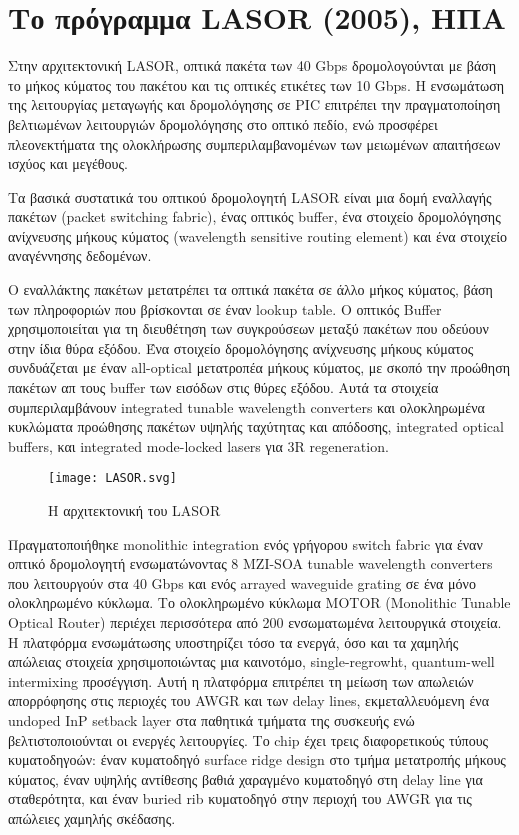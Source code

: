 
\section{Το πρόγραμμα LASOR (2005), ΗΠΑ}

Στην αρχιτεκτονική LASOR, οπτικά πακέτα των 40 Gbps δρομολογούνται με
βάση το μήκος κύματος του πακέτου και τις οπτικές ετικέτες των 10
Gbps. Η ενσωμάτωση της λειτουργίας μεταγωγής και δρομολόγησης σε PIC
επιτρέπει την πραγματοποίηση βελτιωμένων λειτουργιών δρομολόγησης στο
οπτικό πεδίο, ενώ προσφέρει πλεονεκτήματα της ολοκλήρωσης
συμπεριλαμβανομένων των μειωμένων απαιτήσεων ισχύος και μεγέθους.

Τα βασικά συστατικά του οπτικού δρομολογητή LASΟR \cite{1584172} είναι
μια δομή εναλλαγής πακέτων (packet switching fabric), ένας οπτικός
buffer, ένα στοιχείο δρομολόγησης ανίχνευσης μήκους κύματος
(wavelength sensitive routing element) και ένα στοιχείο αναγέννησης
δεδομένων.

Ο εναλλάκτης πακέτων μετατρέπει τα οπτικά πακέτα σε άλλο μήκος
κύματος, βάση των πληροφοριών που βρίσκονται σε έναν lookup table. Ο
οπτικός Buffer χρησιμοποιείται για τη διευθέτηση των συγκρούσεων
μεταξύ πακέτων που οδεύουν στην ίδια θύρα εξόδου. Ένα στοιχείο
δρομολόγησης ανίχνευσης μήκους κύματος συνδυάζεται με έναν all-optical
μετατροπέα μήκους κύματος, με σκοπό την προώθηση πακέτων απ τους
buffer των εισόδων στις θύρες εξόδου. Αυτά τα στοιχεία
συμπεριλαμβάνουν integrated tunable wavelength converters και
ολοκληρωμένα κυκλώματα προώθησης πακέτων υψηλής ταχύτητας και
απόδοσης, integrated optical buffers, και integrated mode-locked
lasers για 3R regeneration.

\begin{figure}[h]
  \centering
  \texttt{[image: LASOR.svg]}
  \caption{Η αρχιτεκτονική του LASOR}
  \label{fig:lasor}
\end{figure}

Πραγματοποιήθηκε monolithic integration ενός γρήγορου switch fabric
για έναν οπτικό δρομολογητή ενσωματώνοντας 8 MZI-SOA tunable
wavelength converters που λειτουργούν στα 40 Gbps και ενός arrayed
waveguide grating σε ένα μόνο ολοκληρωμένο κύκλωμα. \cite{5515982} Το
ολοκληρωμένο κύκλωμα MOTOR (Monolithic Tunable Optical Router)
περιέχει περισσότερα από 200 ενσωματωμένα λειτουργικά στοιχεία. Η
πλατφόρμα ενσωμάτωσης υποστηρίζει τόσο τα ενεργά, όσο και τα χαμηλής
απώλειας στοιχεία χρησιμοποιώντας μια καινοτόμο, single-regrowht,
quantum-well intermixing προσέγγιση. Αυτή η πλατφόρμα επιτρέπει τη
μείωση των απωλειών απορρόφησης στις περιοχές του AWGR και των delay
lines, εκμεταλλευόμενη ένα undoped InP setback layer στα παθητικά
τμήματα της συσκευής ενώ βελτιστοποιούνται οι ενεργές λειτουργίες.  Το
chip έχει τρεις διαφορετικούς τύπους κυματοδηγοών: έναν κυματοδηγό
surface ridge design στο τμήμα μετατροπής μήκους κύματος, έναν υψηλής
αντίθεσης βαθιά χαραγμένο κυματοδηγό στη delay line για σταθερότητα,
και έναν buried rib κυματοδηγό στην περιοχή του AWGR για τις απώλειες
χαμηλής σκέδασης.

